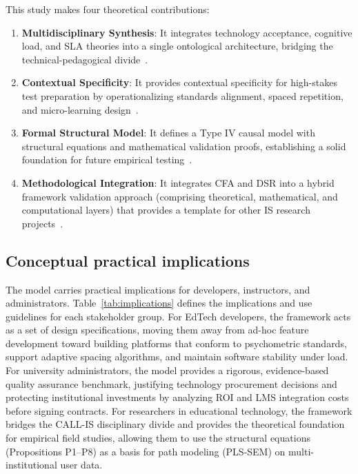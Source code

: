 \documentclass[11pt,a4paper]{article}
\begin{document}
This study makes four theoretical contributions:
\begin{enumerate}
  \item \textbf{Multidisciplinary Synthesis}: It integrates technology acceptance, cognitive load, and SLA theories into a single ontological architecture, bridging the technical-pedagogical divide~\cite{b4}\cite{b6}.
  \item \textbf{Contextual Specificity}: It provides contextual specificity for high-stakes test preparation by operationalizing standards alignment, spaced repetition, and micro-learning design~\cite{b1}\cite{b3}\cite{b5}\cite{b29}.
  \item \textbf{Formal Structural Model}: It defines a Type IV causal model with structural equations and mathematical validation proofs, establishing a solid foundation for future empirical testing~\cite{b11}\cite{b12}.
  \item \textbf{Methodological Integration}: It integrates CFA and DSR into a hybrid framework validation approach (comprising theoretical, mathematical, and computational layers) that provides a template for other IS research projects~\cite{b34}\cite{b35}.
\end{enumerate}

\subsection{Conceptual practical implications}

The model carries practical implications for developers, instructors, and administrators. Table~\ref{tab:implications} defines the implications and use guidelines for each stakeholder group. For EdTech developers, the framework acts as a set of design specifications, moving them away from ad-hoc feature development toward building platforms that conform to psychometric standards, support adaptive spacing algorithms, and maintain software stability under load. For university administrators, the model provides a rigorous, evidence-based quality assurance benchmark, justifying technology procurement decisions and protecting institutional investments by analyzing ROI and LMS integration costs before signing contracts. For researchers in educational technology, the framework bridges the CALL-IS disciplinary divide and provides the theoretical foundation for empirical field studies, allowing them to use the structural equations (Propositions P1--P8) as a basis for path modeling (PLS-SEM) on multi-institutional user data.
\end{document}
